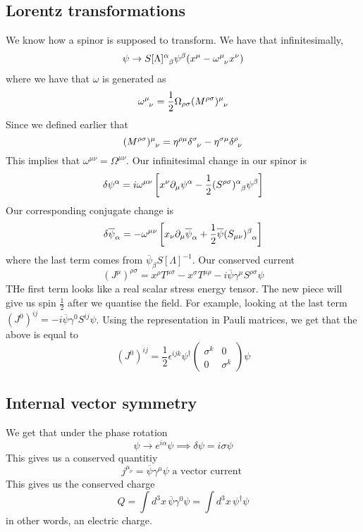 \subsection{Lorentz transformations} 
We know how a spinor is supposed to transform. 
We have that infinitesimally, 
\[
	\psi \to S [ \Lambda ] \indices{ ^ \alpha _ \beta }  \psi ^ \beta  ( x ^ \mu - \omega  \indices{ ^ \mu _ \nu} x ^ \nu )  
\] where we have that $ \omega  $ is generated as 
\[
	\omega \indices{ ^ \mu _ \nu } =  \frac{1}{2 } \Omega_{ \rho \sigma } ( M ^{ \rho \sigma } )\indices{ ^ \mu _ \nu }  
\] Since we defined earlier that 
\[
	( M ^{ \rho \sigma } ) \indices{ ^ \mu _ \nu } = \eta ^{ \rho \mu } \delta \indices{ ^ \sigma _ \nu }
	 - \eta ^{ \sigma \mu } \delta \indices{ ^ \rho _ \nu } 
\] This implies that $ \omega ^{ \mu \nu } = \Omega ^{ \mu \nu } $. 
Our infinitesimal change in our spinor is 
\[
 \delta \psi ^ \alpha    = i \omega ^{ \mu \nu }  \left[ 
 x ^ \nu \partial  _ \mu \psi ^ \alpha  - \frac{1}{2 }  ( S ^{ \rho \sigma } ) \indices{ ^ \alpha 
 _ \beta } \psi ^ \beta  \right] 
\] Our corresponding conjugate change is 
\[
 \delta \overline{ \psi } _ \alpha  = 
  - \omega ^{ \mu \nu } \left[  x _ \nu \partial  _ \mu \overline{\psi }_ \alpha 
  + \frac{1}{2 } \overline{\psi } ( S_{ \mu \nu } ) \indices{ ^ \beta _ \alpha }  \right]  
\] where the last term comes from $ \overline{\psi }_ \beta  S [ \Lambda ] ^{ - 1} $. 
Our conserved current 
\[
 ( J ^ \mu ) ^{ \rho \sigma }  = x ^ \rho T ^{ \mu \sigma } - x ^ \sigma T ^{ \mu \rho }  - i 
 \overline{ \psi } \gamma ^ \mu S ^{ \rho \sigma } \psi 
\] THe first term looks like a real scalar stress energy tensor. 
The new piece will give us spin $ \frac{1}{2 } $ after we quantise the
field. 
For example, looking at the last term $ ( J ^ 0 ) ^{ ij }  =  -i \overline{ \psi } \gamma ^ 0 S ^{ ij } \psi$. 
Using the representation in Pauli matrices, 
we get that the above is equal to 
\[
 ( J ^ 0 ) ^{ ij }  = \frac{1}{2 } \epsilon ^{ ijk  } \psi ^ \dagger 
 \begin{pmatrix}  \sigma ^ k & 0 \\ 0 & \sigma ^ k  \end{pmatrix} \psi  
\] 
\subsection{Internal vector symmetry} 
We get that under the phase rotation 
\[
 \psi \to e^{ i \alpha } \psi \implies \delta \psi  = i \sigma \psi 
\] This gives us a conserved quantitiy 
\[
 j ^{ \mu _ \nu }  = \overline{ \psi } \gamma ^ \mu \psi \text{ a vector current }
\] This gives us the conserved charge 
\[
 Q = \int d^ 3 x \, \overline{\psi } \gamma^ 0 \psi  = \int d ^ 3 x \, \psi ^ \dagger \psi 
\]  in other words, an electric charge. 


